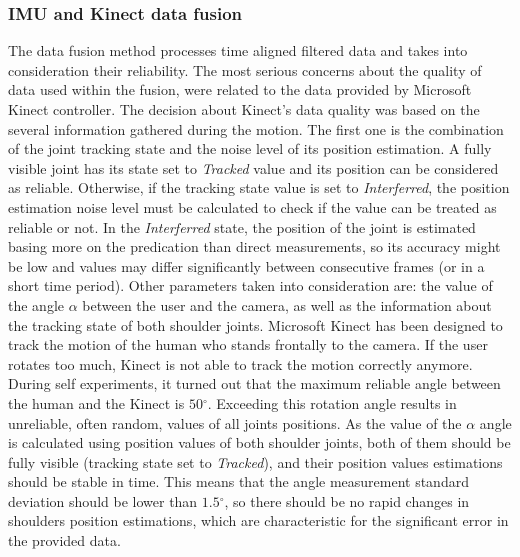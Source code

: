 \documentclass[sensors,article,submit,moreauthors,pdftex,10pt,a4paper]{mdpi}
\newcommand{\degree}{\ensuremath{{}^{\circ}}\xspace}
\begin{document}
\subsubsection{IMU and Kinect data fusion}
The data fusion method processes time aligned filtered data and takes into consideration their reliability. The most serious concerns about the quality of data used within the fusion, were related to the data provided by Microsoft Kinect controller. The decision about Kinect’s data quality was based on the several information gathered during the motion. The first one is the combination of the joint tracking state and the noise level of its position estimation. A fully visible joint has its state set to \emph{Tracked} value and its position can be considered as reliable. Otherwise, if the tracking state value is set to \emph{Interferred}, the position estimation noise level must be calculated to check if the value can be treated as reliable or not. In the \emph{Interferred} state, the position of the joint is estimated basing more on the predication than direct measurements, so its accuracy might be low and values may differ significantly between consecutive frames (or in a short time period). Other parameters taken into consideration are: the value of the angle $\alpha$ between the user and the camera, as well as the information about the tracking state of both shoulder joints. Microsoft Kinect has been designed to track the motion of the human who stands frontally to the camera. If the user rotates too much, Kinect is not able to track the motion correctly anymore. During self experiments, it turned out that the maximum reliable angle between the human and the Kinect is $50\degree$. Exceeding this rotation angle results in unreliable, often random, values of all joints positions. As the value of the $\alpha$ angle is calculated using position values of both shoulder joints, both of them should be fully visible (tracking state set to \emph{Tracked}), and their position values estimations should be stable in time. This means that the angle measurement standard deviation should be lower than $1.5\degree$, so there should be no rapid changes in shoulders position estimations, which are characteristic for the significant error in the provided data. 
		
\end{document}
